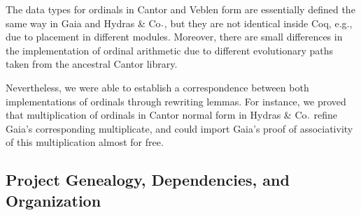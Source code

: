 \documentclass{easychair}
\newcommand{\Hydras}{Hydras \& Co$\text.$\xspace}
\begin{document}
The data types for ordinals in Cantor and Veblen form are essentially defined the same way in Gaia and \Hydras, but they are not identical inside Coq, e.g., due to placement in different modules. Moreover, there are small differences in the implementation of ordinal arithmetic due to different evolutionary paths taken from the ancestral Cantor library.

Nevertheless, we were able to establish a correspondence between both implementations of ordinals through rewriting lemmas. For instance, we proved that multiplication of ordinals in Cantor normal form in \Hydras refine Gaia's corresponding multiplicate, and could import Gaia's proof of associativity of this multiplication almost for free.

\subsection{Project Genealogy, Dependencies, and Organization}
\end{document}
